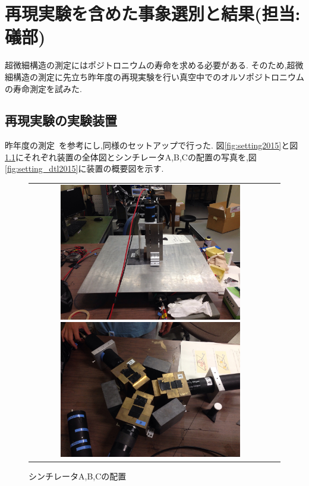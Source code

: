 \chapter{再現実験を含めた事象選別と結果(担当:礒部)}\label{result}

超微細構造の測定にはポジトロニウムの寿命を求める必要がある.
そのため,超微細構造の測定に先立ち昨年度の再現実験を行い真空中でのオルソポジトロニウムの寿命測定を試みた.

\section{再現実験の実験装置}
昨年度の測定~\cite{卒業論文2015}を参考にし,同様のセットアップで行った.
図\ref{fig:setting2015}と図\ref{fig:pmt_setting2015}にそれぞれ装置の全体図とシンチレータA,B,Cの配置の写真を,図\ref{fig:setting_dtl2015}に装置の概要図を示す.
\begin{figure}[htbp]
	\begin{tabular}{cc}
		\begin{minipage}{0.5\hsize}
			\centering
				\includegraphics[width=80mm]{img/isb/setting_overview.JPG}
				\caption{装置の全体写真}
				\label{fig:setting2015}
		\end{minipage}
		\begin{minipage}{0.5\hsize}
			\centering
			\includegraphics[width=80mm]{img/isb/pmt_setting.JPG}
				\caption{シンチレータA,B,Cの配置}
				\label{fig:pmt_setting2015}
		\end{minipage}
	\end{tabular}
\end{figure}

